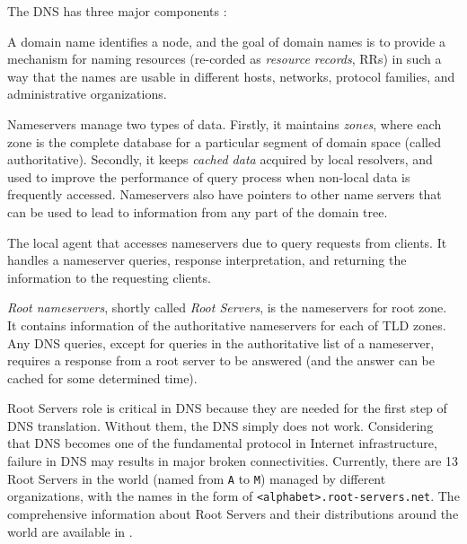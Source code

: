 The DNS has three major components \cite{rfc1034}:
\begin{description}
	\setlength{\itemsep}{1pt}
	\setlength{\parskip}{0pt}
	\item[The domain name space and resource records] A domain name \cite{rfc1035} identifies a node, and the goal of domain names is to provide a mechanism for naming resources (re-corded as \textit{resource records}, RRs) in such a way that the names are usable in different hosts, networks, protocol families, and administrative organizations. 
	\item[Nameservers] Nameservers manage two types of data. Firstly, it maintains \textit{zones}, where each zone is the complete database for a particular segment of domain space (called authoritative). Secondly, it keeps \textit{cached data} acquired by local resolvers, and used to improve the performance of query process when non-local data is frequently accessed. Nameservers also have pointers to other name servers that can be used to lead to information from any part of the domain tree. 
	\item[Resolvers] The local agent that accesses	 nameservers due to query requests from clients. It handles a nameserver queries, response interpretation, and returning the information to the requesting clients. 
\end{description}

\textit{Root nameservers}, shortly called \textit{Root Servers}, is the nameservers for root zone. It contains information of the authoritative nameservers for each of TLD zones. Any DNS queries, except for queries in the authoritative list of a nameserver, requires a response from a root server to be answered (and the answer can be cached for some determined time). 

Root Servers role is critical in DNS because they are needed for the first step of DNS translation. Without them, the DNS simply does not work. Considering that DNS becomes one of the fundamental protocol in Internet infrastructure, failure in DNS may results in major broken connectivities. Currently, there are 13 Root Servers in the world (named from \texttt{A} to \texttt{M}) managed by different organizations, with the names in the form of \texttt{<alphabet>.root-servers.net}. The comprehensive information about Root Servers and their distributions around the world are available in \cite{site:root-servers}.


